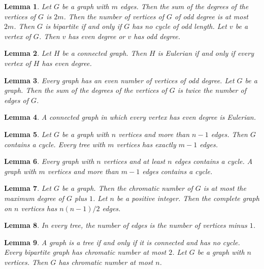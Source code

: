 \documentclass{article}
\newtheorem{lemma}{Lemma}
\begin{document}
\begin{lemma}\label{handshake}
Let $G$ be a graph with $m$ edges. Then the sum of the degrees of the vertices of $G$ is $2m$. Then the number of vertices of $G$ of odd degree is at most $2m$. Then $G$ is bipartite if and only if $G$ has no cycle of odd length. Let $v$ be a vertex of $G$. Then $v$ has even degree or $v$ has odd degree.
\end{lemma}

\begin{lemma}\label{euler}
Let $H$ be a connected graph. Then $H$ is Eulerian if and only if every vertex of $H$ has even degree.
\end{lemma}

\begin{lemma}\label{handshake-parity}
Every graph has an even number of vertices of odd degree. Let $G$ be a graph. Then the sum of the degrees of the vertices of $G$ is twice the number of edges of $G$.
\end{lemma}

\begin{lemma}\label{in-which-graph}
A connected graph in which every vertex has even degree is Eulerian.
\end{lemma}

\begin{lemma}\label{more-than}
Let $G$ be a graph with $n$ vertices and more than $n-1$ edges. Then $G$ contains a cycle. Every tree with $m$ vertices has exactly $m-1$ edges.
\end{lemma}

\begin{lemma}\label{every-with-and}
Every graph with $n$ vertices and at least $n$ edges contains a cycle. A graph with $m$ vertices and more than $m-1$ edges contains a cycle.
\end{lemma}

\begin{lemma}\label{notions-in-claims}
Let $G$ be a graph. Then the chromatic number of $G$ is at most the maximum degree of $G$ plus $1$. Let $n$ be a positive integer. Then the complete graph on $n$ vertices has $n(n-1)/2$ edges.
\end{lemma}

\begin{lemma}\label{in-every}
In every tree, the number of edges is the number of vertices minus $1$.
\end{lemma}

\begin{lemma}\label{elliptic-and-bounds}
A graph is a tree if and only if it is connected and has no cycle. Every bipartite graph has chromatic number at most $2$. Let $G$ be a graph with $n$ vertices. Then $G$ has chromatic number at most $n$.
\end{lemma}
\end{document}
